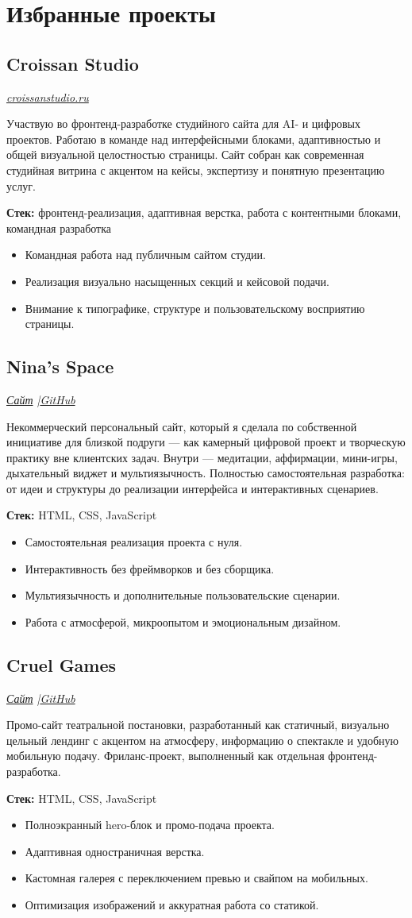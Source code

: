 \documentclass[11pt,a4paper]{article}
\newcommand{\project}[5]{
  \subsection*{#1}
  \textit{#2}

  #3

  \textbf{Стек:} #4

  #5
}
\begin{document}
\section*{Избранные проекты}

\project
{Croissan Studio}
{\href{https://croissanstudio.ru}{croissanstudio.ru}}
{
Участвую во фронтенд-разработке студийного сайта для AI- и цифровых проектов. Работаю в команде над интерфейсными блоками, адаптивностью и общей визуальной целостностью страницы. Сайт собран как современная студийная витрина с акцентом на кейсы, экспертизу и понятную презентацию услуг.
}
{фронтенд-реализация, адаптивная верстка, работа с контентными блоками, командная разработка}
{
\begin{itemize}
  \item Командная работа над публичным сайтом студии.
  \item Реализация визуально насыщенных секций и кейсовой подачи.
  \item Внимание к типографике, структуре и пользовательскому восприятию страницы.
\end{itemize}
}

\project
{Nina's Space}
{\href{https://ninas-space.vercel.app/}{Сайт} \quad|\quad \href{https://github.com/natagapova/ninas-space}{GitHub}}
{
Некоммерческий персональный сайт, который я сделала по собственной инициативе для близкой подруги — как камерный цифровой проект и творческую практику вне клиентских задач. Внутри — медитации, аффирмации, мини-игры, дыхательный виджет и мультиязычность. Полностью самостоятельная разработка: от идеи и структуры до реализации интерфейса и интерактивных сценариев.
}
{HTML, CSS, JavaScript}
{
\begin{itemize}
  \item Самостоятельная реализация проекта с нуля.
  \item Интерактивность без фреймворков и без сборщика.
  \item Мультиязычность и дополнительные пользовательские сценарии.
  \item Работа с атмосферой, микроопытом и эмоциональным дизайном.
\end{itemize}
}

\project
{Cruel Games}
{\href{https://cruelgames-website.vercel.app/}{Сайт} \quad|\quad \href{https://github.com/natagapova/cruelgames-website}{GitHub}}
{
Промо-сайт театральной постановки, разработанный как статичный, визуально цельный лендинг с акцентом на атмосферу, информацию о спектакле и удобную мобильную подачу. Фриланс-проект, выполненный как отдельная фронтенд-разработка.
}
{HTML, CSS, JavaScript}
{
\begin{itemize}
  \item Полноэкранный hero-блок и промо-подача проекта.
  \item Адаптивная одностраничная верстка.
  \item Кастомная галерея с переключением превью и свайпом на мобильных.
  \item Оптимизация изображений и аккуратная работа со статикой.
\end{itemize}
}
\end{document}
